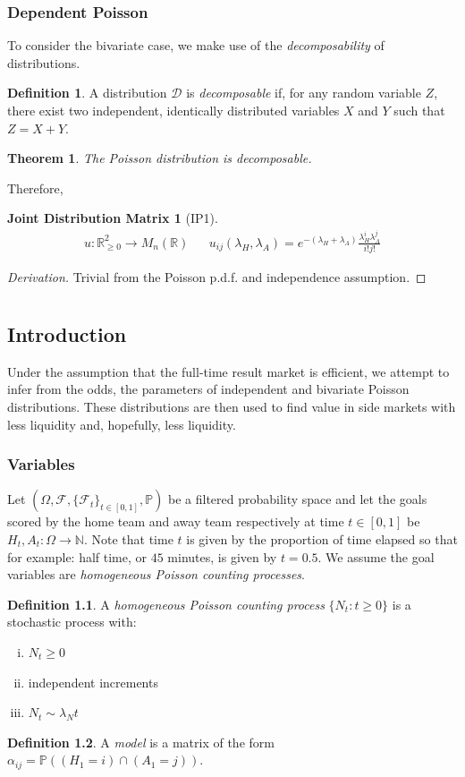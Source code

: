 \documentclass[a4paper,11pt,oneside]{book}
\theoremstyle{plain}
\newtheorem{thm}{Theorem}[section]
\newtheorem*{jdm}{Joint Distribution Matrix}
\theoremstyle{definition}
\newtheorem{defn}{Definition}[section]
\begin{document}
\subsection{Dependent Poisson }
To consider the bivariate case, we make use of the \emph{decomposability} of distributions.
\begin{defn}
A distribution $\mathcal{D}$ is \emph{decomposable} if, for any random variable $Z$, there exist two independent, identically distributed variables $X$ and $Y$ such that $Z=X+Y$.
\end{defn}
\begin{thm}
The Poisson distribution is decomposable.
\end{thm}
Therefore, 
\begin{jdm}[IP1]
\begin{align*}
u: \mathbb{R}^2_{\ge 0} \rightarrow M_n(\mathbb{R}) && u_{ij}(\lambda_H,\lambda_A)=e^{-(\lambda_H+\lambda_A)}\frac{\lambda_H^i\lambda_A^j}{i!j!}
\end{align*}
\end{jdm}
\begin{proof}[Derivation]
Trivial from the Poisson p.d.f. and independence assumption.
\end{proof}

\chapter{}
\section{Introduction}
Under the assumption that the full-time result market is efficient, we attempt to infer from the odds, the parameters of independent and bivariate Poisson distributions. These distributions are then used to find value in side markets with less liquidity and, hopefully, less liquidity. 
\subsection{Variables}
Let $(\Omega,\mathcal{F},\{\mathcal{F}_t\}_{t \in [0,1]},\mathbb{P})$ be a filtered probability space and let the goals scored by the home team and away team respectively at time $t \in [0,1]$ be $H_t,A_t:\Omega\rightarrow \mathbb{N}$. Note that time $t$ is given by the proportion of time elapsed so that for example: half time, or $45$ minutes, is given by $t=0.5$. We assume the goal variables are \emph{homogeneous Poisson counting processes}.
\begin{defn} A \emph{homogeneous Poisson counting process} $\{N_t:t \ge 0\}$ is a stochastic process with:
\begin{enumerate}[i.]
\item $N_t \ge 0$
\item independent increments
\item $N_t \sim \lambda_Nt$
\end{enumerate} 
\end{defn}
\begin{defn}
A \emph{model} is a matrix of the form $\alpha_{ij}=\mathbb{P}((H_1=i)\cap (A_1=j))$.
\end{defn}
\end{document}
